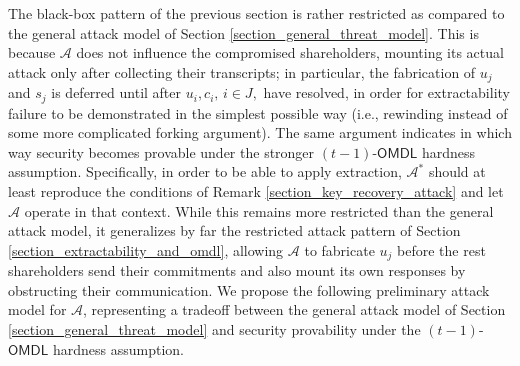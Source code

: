 \documentclass{iacrtrans}
\begin{document}
The black-box pattern of the previous section
is rather restricted as compared to
the general attack model of
Section \ref{section_general_threat_model}.
This is because $\mathcal{A}$ does
not influence the compromised shareholders,
mounting its actual attack only after collecting their
transcripts; in particular,
the fabrication of $u_j$ and $s_j$
is deferred until after $u_i, c_i,\hspace{2pt} i \in J,$
have resolved,
in order for extractability failure
to be demonstrated in the simplest possible way
(i.e., rewinding instead of some more complicated forking argument).
The same argument
indicates in which way security becomes provable under
the stronger $(t-1)$-$\mathsf{OMDL}$ hardness assumption.
Specifically, in order to be able to apply extraction,
$\mathcal{A}^*$ should at least reproduce
the conditions of Remark \ref{section_key_recovery_attack}
and let $\mathcal{A}$ operate in that context.
While this remains more restricted than the general attack model,
it generalizes by far the restricted attack pattern of Section
\ref{section_extractability_and_omdl}, allowing
$\mathcal{A}$ to fabricate $u_j$ before the rest shareholders
send their commitments and also mount its own responses
by obstructing their communication.
We propose the following preliminary attack model for $\mathcal{A}$,
representing a tradeoff between
the general attack model of Section \ref{section_general_threat_model}
and security provability
under the $(t-1)$-$\mathsf{OMDL}$ hardness assumption.
\end{document}
